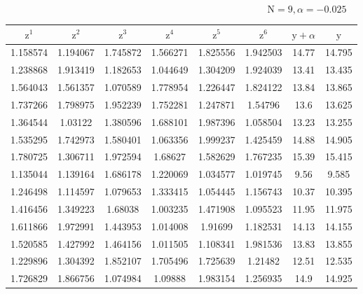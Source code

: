 \vspace{-0.75\baselineskip}

\begin{equation*}
    \textrm{N} = 9, \alpha = -0.025
\end{equation*}

\renewcommand{\arraystretch}{0.65}
\begin{center}
    \begin{tabular}{ | c | c | c | c | c | c | c | c | } 
      \hline
      $\textrm{z}^1$ & $\textrm{z}^2$ & $\textrm{z}^3$ & $\textrm{z}^4$ & $\textrm{z}^5$ & $\textrm{z}^6$ & $\textrm{y} + \alpha$ & $\textrm{y}$ \\
      \hline
      1.158574 & 1.194067 & 1.745872 & 1.566271 & 1.825556 & 1.942503 & 14.77 & 14.795 \\ 
      \hline 
      1.238868 & 1.913419 & 1.182653 & 1.044649 & 1.304209 & 1.924039 & 13.41 & 13.435 \\ 
      \hline 
      1.564043 & 1.561357 & 1.070589 & 1.778954 & 1.226447 & 1.824122 & 13.84 & 13.865 \\ 
      \hline 
      1.737266 & 1.798975 & 1.952239 & 1.752281 & 1.247871 & 1.54796 & 13.6 & 13.625 \\ 
      \hline 
      1.364544 & 1.03122 & 1.380596 & 1.688101 & 1.987396 & 1.058504 & 13.23 & 13.255 \\ 
      \hline 
      1.535295 & 1.742973 & 1.580401 & 1.063356 & 1.999237 & 1.425459 & 14.88 & 14.905 \\ 
      \hline 
      1.780725 & 1.306711 & 1.972594 & 1.68627 & 1.582629 & 1.767235 & 15.39 & 15.415 \\ 
      \hline 
      1.135044 & 1.139164 & 1.686178 & 1.220069 & 1.034577 & 1.019745 & 9.56 & 9.585 \\ 
      \hline 
      1.246498 & 1.114597 & 1.079653 & 1.333415 & 1.054445 & 1.156743 & 10.37 & 10.395 \\ 
      \hline 
      1.416456 & 1.349223 & 1.68038 & 1.003235 & 1.471908 & 1.095523 & 11.95 & 11.975 \\ 
      \hline 
      1.611866 & 1.972991 & 1.443953 & 1.014008 & 1.91699 & 1.182531 & 14.13 & 14.155 \\ 
      \hline 
      1.520585 & 1.427992 & 1.464156 & 1.011505 & 1.108341 & 1.981536 & 13.83 & 13.855 \\ 
      \hline 
      1.229896 & 1.304392 & 1.852107 & 1.705496 & 1.725639 & 1.21482 & 12.51 & 12.535 \\ 
      \hline 
      1.726829 & 1.866756 & 1.074984 & 1.09888 & 1.983154 & 1.256935 & 14.9 & 14.925 \\ 

\end{tabular}
\end{center}
